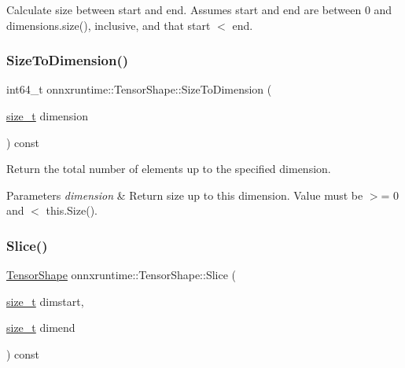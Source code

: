 Calculate size between start and end. Assumes start and end are between 0 and dimensions.\+size(), inclusive, and that start $<$ end. \mbox{\label{classonnxruntime_1_1TensorShape_af322918934d44918346fe19526f52897}} 
\subsubsection{\texorpdfstring{Size\+To\+Dimension()}{SizeToDimension()}}
{\footnotesize\ttfamily int64\+\_\+t onnxruntime\+::\+Tensor\+Shape\+::\+Size\+To\+Dimension (\begin{DoxyParamCaption}\item[{\mbox{\hyperlink{mlasi_8h_a503efbc1c6e50825320ad909366b78ab}{size\+\_\+t}}}]{dimension }\end{DoxyParamCaption}) const}

Return the total number of elements up to the specified dimension. 
\begin{DoxyParams}{Parameters}
{\em dimension} & Return size up to this dimension. Value must be $>$= 0 and $<$ this.\+Size(). \\
\hline
\end{DoxyParams}
\mbox{\label{classonnxruntime_1_1TensorShape_a996be17420fdb94cd5de15301a50d9be}} 
\subsubsection{\texorpdfstring{Slice()}{Slice()}\hspace{0.1cm}{\footnotesize\ttfamily [1/2]}}
{\footnotesize\ttfamily \mbox{\hyperlink{classonnxruntime_1_1TensorShape}{Tensor\+Shape}} onnxruntime\+::\+Tensor\+Shape\+::\+Slice (\begin{DoxyParamCaption}\item[{\mbox{\hyperlink{mlasi_8h_a503efbc1c6e50825320ad909366b78ab}{size\+\_\+t}}}]{dimstart,  }\item[{\mbox{\hyperlink{mlasi_8h_a503efbc1c6e50825320ad909366b78ab}{size\+\_\+t}}}]{dimend }\end{DoxyParamCaption}) const}


